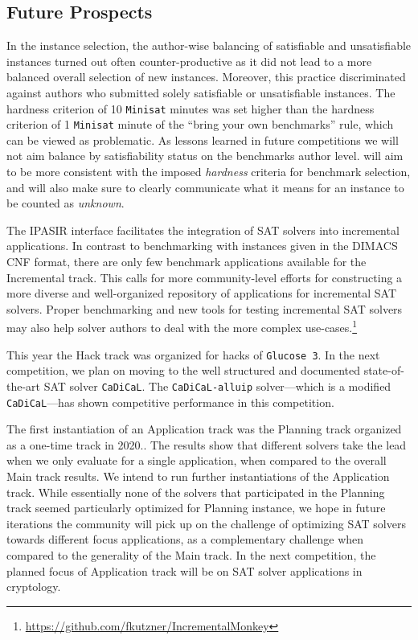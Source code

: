 \documentclass{elsarticle}
\newcommand{\solver}[1]{\texttt{#1}}
\begin{document}
\subsection*{Future Prospects}

In the instance selection, the author-wise balancing of satisfiable and unsatisfiable instances turned out often counter-productive as it 
did not lead to a more balanced overall selection of new instances. 
Moreover, this practice discriminated against authors who submitted solely satisfiable or unsatisfiable  instances. 
The hardness criterion of 10 \solver{Minisat} minutes was set higher than the hardness criterion of 1 \solver{Minisat} minute of the ``bring your own benchmarks'' rule, 
which can be viewed as problematic. As lessons learned
in future competitions we will not aim balance by satisfiability status on the benchmarks author level. will aim to be more consistent with the imposed \emph{hardness} criteria
for benchmark selection, and will also make sure to clearly communicate what it means for an instance to be counted as \emph{unknown}.

The IPASIR interface facilitates the integration of SAT solvers into incremental applications. 
In contrast to benchmarking with instances given in the 
DIMACS CNF format, there are only few benchmark applications available for the Incremental track.
This calls for more community-level efforts for constructing a more diverse and well-organized repository of applications for incremental SAT solvers. 
Proper benchmarking and new tools for testing incremental SAT solvers may also help solver authors to deal with the more complex use-cases.\footnote{\url{https://github.com/fkutzner/IncrementalMonkey}} 

This year the Hack track was organized for hacks of \solver{Glucose 3}. 
In the next competition, we plan on moving to the well structured and documented state-of-the-art SAT solver \solver{CaDiCaL}. 
The \solver{CaDiCaL-alluip} solver---which is a modified \solver{CaDiCaL}---has shown competitive performance in this competition.

The first instantiation of an Application track was the Planning track organized as a one-time track in 2020.. 
The results show that different solvers take the lead when we only evaluate for a single application, when compared to the overall Main track results.
We intend to run further instantiations of the Application track. 
While essentially none of the solvers that participated in the Planning track seemed particularly optimized for Planning instance, we hope
in future iterations the community will pick up on the challenge of optimizing SAT solvers towards different focus applications, as a complementary
challenge when compared to the generality of the Main track.
In the next competition, the  planned focus of Application track will be on SAT solver applications in cryptology.
\end{document}
